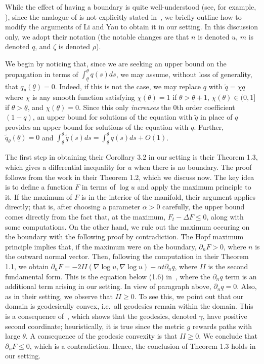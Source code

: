 \documentclass[11pt]{article}    %
\begin{document}
While the effect of having a boundary is quite well-understood (see, for example, \cite{Wang}), since the analogue of  \cite[Corollary 3.2]{LiYau} is not explicitly stated in~\cite{Wang}, we briefly outline how to modify the arguments of Li and Yau to obtain it in our setting. In this discussion only, we adopt their notation (the notable changes are that $n$ is denoted $u$, $m$ is denoted $q$, and $\zeta$ is denoted $\rho$).

We begin by noticing that, since we are seeking an upper bound on the propagation in terms of $\int_{\underline\theta}^\theta q(s)ds$, we may assume, without loss of generality, that $q_\theta(\underline\theta) = 0$.  Indeed, if this is not the case, we may replace $q$ with $\tilde q = \chi q$ where $\chi$ is any smooth function satisfying $\chi(\theta) = 1$ if $\theta > \underline \theta + 1$, $\chi(\theta) \in(0,1]$ if $\theta > \underline\theta$, and $\chi(\underline\theta) = 0$.  Since this only {\em increases} the 0th order coefficient $(1-q)$, an upper bound for solutions of the equation with $\tilde q$ in place of $q$ provides an upper bound for solutions of the equation with $q$.  Further, $\tilde q_\theta(\underline\theta) = 0$ and $\int_{\underline\theta}^\theta \tilde q(s) ds = \int_{\underline\theta}^\theta q(s) ds + O(1)$.

The first step in obtaining their Corollary 3.2 in our setting is their Theorem 1.3, which gives a differential inequality for $u$ when there is no boundary.  The proof follows from the work in their Theorem 1.2, which we discuss now.  The key idea is to define a function $F$ in terms of $\log u$ and apply the maximum principle to it.  If the maximum of $F$ is in the interior of the manifold, their argument applies directly;  that is, after choosing a parameter $\alpha>0$ carefully, the upper bound comes directly from the fact that, at the maximum, $F_t - \Delta F \leq 0$, along with some computations.  On the other hand, we rule out the maximum occuring on the boundary with the following proof by contradiction.  The Hopf maximum principle implies that, if the maximum were on the boundary, $\partial_n F > 0$, where $n$ is the outward normal vector.  Then, following the computation in their Theorem 1.1, we obtain $\partial_n F = -2 II(\nabla \log u, \nabla \log u) - \alpha t\partial_n q$, where $II$ is the second fundamental form.  This is the equation below (1.6) in~\cite{LiYau}, where the $\partial_n q$ term is an additional term arising in our setting.   In view of paragraph above, $\partial_n q=0$.   Also, as in their setting, we observe that $II\geq 0$.  To see this, we point out that our domain is geodesically convex, i.e.~all geodesics remain within the domain.  This is a consequence of~\cite[Lemma A.2.(iii)]{HendersonPerthameSouganidis}, which shows that the geodesics, denoted $\gamma$, have positive second coordinate; heuristically, it is true since the metric $g$ rewards paths with large $\theta$.  A consequence of the geodesic convexity is that $II \geq 0$.  We conclude that $\partial_n F \leq 0$, which is a contradiction.  Hence, the conclusion of Theorem 1.3 holds in our setting.
\end{document}
